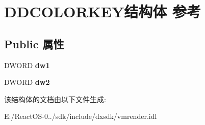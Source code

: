 \hypertarget{struct_d_d_c_o_l_o_r_k_e_y}{}\section{D\+D\+C\+O\+L\+O\+R\+K\+E\+Y结构体 参考}
\label{struct_d_d_c_o_l_o_r_k_e_y}
\subsection*{Public 属性}
\begin{DoxyCompactItemize}
\item 
\mbox{\label{struct_d_d_c_o_l_o_r_k_e_y_a1555b2f068fcd6bb4be08f530e334cf9}} 
D\+W\+O\+RD {\bfseries dw1}
\item 
\mbox{\label{struct_d_d_c_o_l_o_r_k_e_y_a1a770926c84a9891dcc4e7fa9f3be26d}} 
D\+W\+O\+RD {\bfseries dw2}
\end{DoxyCompactItemize}


该结构体的文档由以下文件生成\+:\begin{DoxyCompactItemize}
\item 
E\+:/\+React\+O\+S-\/0../sdk/include/dxsdk/vmrender.\+idl\end{DoxyCompactItemize}
